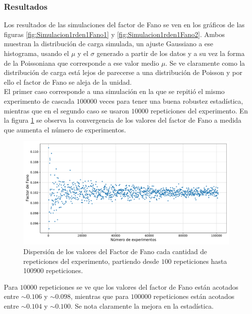 \subsubsection{Resultados}
\noindent Los resultados de las simulaciones del factor de Fano se ven en los gráficos de las figuras \ref{fig:Simulacion1rden1Fano1} y \ref{fig:Simulacion1rden1Fano2}. Ambos muestran la distribución de carga simulada, un ajuste Gaussiano a ese histograma, usando el $\mu$ y el $\sigma$ generado a partir de los datos y a su vez la forma de la Poissoniana que corresponde a ese valor medio $\mu$. Se ve claramente como la distribución de carga está lejos de parecerse a una distribución de Poisson y por ello el factor de Fano se aleja de la unidad.\\
\indent El primer caso corresponde a una simulación en la que se repitió el mismo experimento de cascada $100000$ veces para tener una buena robustez estadística, mientras que en el segundo caso se usaron $10000$ repeticiones del experimento. En la figura \ref{fig:FanoConvergencia} se observa la convergencia de los valores del factor de Fano a medida que aumenta el número de experimentos.
\begin{figure}[h]
    \centering
    \includegraphics[scale=0.5]{Figs/FanoConvergencia.pdf}
    \caption{\footnotesize{Dispersión de los valores del Factor de Fano cada cantidad de repeticiones del experimento, partiendo desde $100$ repeticiones hasta 100900 repeticiones.}}
    \label{fig:FanoConvergencia}
\end{figure}
Para $10000$ repeticiones se ve que los valores del factor de Fano están acotados entre $\sim 0.106$ y $\sim 0.098$, mientras que para $100000$ repeticiones están acotados entre $\sim 0.104$ y $\sim 0.100$. Se nota claramente la mejora en la estadística.\\
